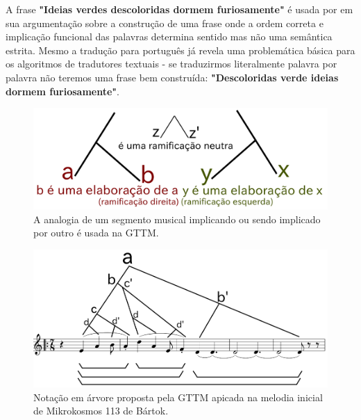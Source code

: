 \documentclass[
	12pt,				%
	openright,			%
	twoside,			%
	a4paper,			%
	english,			%
	french,				%
	spanish,			%
	brazil				%
	]{abntex2}
\begin{document}
A frase \textbf{"Ideias verdes descoloridas dormem furiosamente"} é usada por  em sua argumentação sobre a construção de uma frase onde a ordem correta e implicação funcional das palavras determina sentido mas não uma semântica estrita. Mesmo a tradução para português já revela uma problemática básica para os algoritmos de tradutores textuais - se traduzirmos literalmente palavra por palavra não teremos uma frase bem construída: \textbf{"Descoloridas verde ideias dormem furiosamente"}.


\begin{figure}[!h]
	\caption{\label{fig_grafico}A analogia de um segmento musical implicando ou sendo implicado por outro é usada na GTTM.}
	\begin{center}
	    \includegraphics[scale=0.4]{gttm/ramificacoes_arvore.pdf}
	\end{center}
\end{figure}


\begin{figure}[!h]
	\caption{\label{fig_grafico}Notação em árvore proposta pela GTTM apicada na melodia inicial de Mikrokosmos 113 de Bártok.}
	\begin{center}
	    \includegraphics[scale=0.4]{mikro/mikro113_GTTM_tree.png}
	\end{center}
\end{figure} 
\end{document}
